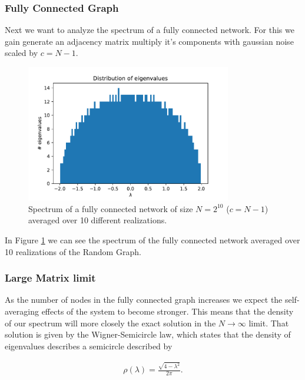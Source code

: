 \documentclass[../main.tex]{subfiles}
\begin{document}
\subsubsection{Fully Connected Graph}

Next we want to analyze the spectrum of a fully connected network. For this we gain generate an adjacency matrix multiply it's components with gaussian noise scaled by $c = N-1$.

\begin{figure}[htpb]
    \centering
    \includegraphics[width=0.8\textwidth]{../figures/2_1_2_spectrum_full.pdf}
    \caption{Spectrum of a fully connected network of size $N = 2^{10}$ ($c = N-1$) averaged over 10 different realizations.}
    \label{fig:spectrum_full}
\end{figure}

In Figure \ref{fig:spectrum_full} we can see the spectrum of the fully connected network averaged over 10 realizations of the Random Graph.



\subsubsection{Large Matrix limit}

As the number of nodes in the fully connected graph increases we expect the self-averaging effects of the system to become stronger.
This means that the density of our spectrum will more closely the exact solution in the $N\to \infty$ limit.
That solution is given by the Wigner-Semicircle law, which states that the density of eigenvalues describes a semicircle described by 

\begin{align}\label{eq:wigner_semicircle}
    \rho(\lambda) = \frac{\sqrt{4 - \lambda^2} }{2 \pi}
.\end{align}
\end{document}
